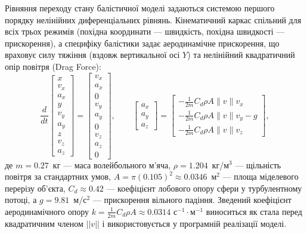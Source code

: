 Рівняння переходу стану балістичної моделі задаються системою першого порядку
нелінійних диференціальних рівнянь. Кінематичний каркас спільний для всіх трьох
режимів (похідна координати --- швидкість, похідна швидкості --- прискорення), а
специфіку балістики задає аеродинамічне прискорення, що враховує силу тяжіння
(вздовж вертикальної осі $Y$) та нелінійний квадратичний опір повітря (Drag
Force):
\begin{equation}\frac{d}{dt} \begin{bmatrix} x \\ v_x \\ a_x \\ y \\ v_y \\ a_y \\ z \\ v_z \\ a_z \end{bmatrix} =
\begin{bmatrix} v_x \\ a_x \\ 0 \\ v_y \\ a_y \\ 0 \\ v_z \\ a_z \\ 0 \end{bmatrix},
\qquad
\begin{bmatrix} a_x \\ a_y \\ a_z \end{bmatrix} =
\begin{bmatrix} -\frac{1}{2m}C_{d}\rho A \|v\| v_x \\
    -\frac{1}{2m}C_{d}\rho A \|v\| v_y - g \\
    -\frac{1}{2m}C_{d}\rho A \|v\| v_z \end{bmatrix},\end{equation}
де $m=0.27$~кг --- маса волейбольного м'яча, $\rho=1.204$~кг/м$^{3}$ --- щільність повітря за стандартних умов,
$A=\pi(0.105)^{2}\approx0.0346$~м$^{2}$ --- площа міделевого перерізу об'єкта, $C_{d}\approx0.42$ --- коефіцієнт
лобового опору сфери у турбулентному потоці, а $g = 9.81$~м/с$^2$ --- прискорення вільного падіння. Зведений коефіцієнт
аеродинамічного опору $k = \frac{1}{2m}C_{d}\rho A \approx 0.0314$ с$^{-1}\cdot$м$^{-1}$ виноситься як стала перед
квадратичним членом $||v||$ і використовується у програмній реалізації моделі.

